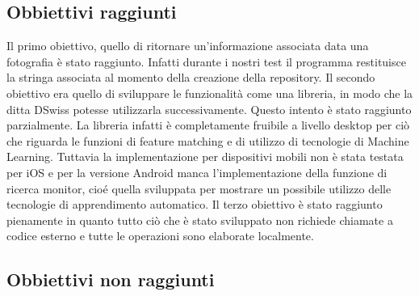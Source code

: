 \documentclass[twoside]{supsistudent}
\begin{document}
\subsection{Obbiettivi raggiunti}
Il primo obiettivo, quello di ritornare un'informazione associata data una fotografia è stato raggiunto. Infatti durante i nostri test il programma restituisce la stringa associata al momento della creazione della repository. 
Il secondo obiettivo era quello di sviluppare le funzionalità come una libreria, in modo che la ditta DSwiss potesse utilizzarla successivamente. Questo intento è stato raggiunto parzialmente. La libreria infatti è completamente fruibile a livello desktop per ciò che riguarda le funzioni di feature matching e di utilizzo di tecnologie di Machine Learning. Tuttavia la implementazione per dispositivi mobili non è stata testata per iOS e per la versione Android manca l'implementazione della funzione di ricerca monitor, cioé quella sviluppata per mostrare un possibile utilizzo delle tecnologie di apprendimento automatico.
Il terzo obiettivo è stato raggiunto pienamente in quanto tutto ciò che è stato sviluppato non richiede chiamate a codice esterno e tutte le operazioni sono elaborate localmente.
\subsection{Obbiettivi non raggiunti}
\end{document}
